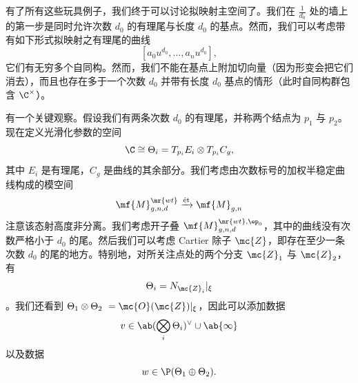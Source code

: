 有了所有这些玩具例子，我们终于可以讨论拟映射主空间了。我们在 \(\frac{1}{d_0}\) 处的墙上的第一步是同时允许次数 \(d_0\) 的有理尾与长度 \(d_0\) 的基点。然而，我们可以考虑带有如下形式拟映射之有理尾的曲线
\[ [a_0 u^{d_0}, \ldots, a_n u^{d_0}], \]
它们有无穷多个自同构。然而，我们不能在基点上附加切向量（因为形变会把它们消去），而且也存在多于一个次数 \(d_0\) 并带有长度 \(d_0\) 基点的情形（此时自同构群包含 \(\C^{\times}\)）。

\begin{rmk}
    有一个关键观察。假设我们有两条次数 \(d_0\) 的有理尾，并称两个结点为 \(p_1\) 与 \(p_2\)。现在定义光滑化参数的空间
    \[ \C \cong \Theta_i = T_{p_i} E_i \otimes T_{p_i} C_g, \]
    其中 \(E_i\) 是有理尾，\(C_g\) 是曲线的其余部分。我们考虑由次数标号的加权半稳定曲线构成的模空间
    \[ \mf{M}_{g,n,d}^{\mr{wt}} \xrightarrow{\text{\'et}} \mf{M}_{g,n} \]
    注意该态射高度非分离。我们考虑开子叠 \(\mf{M}_{g,n,d}^{\mr{wt}, \ep_0}\)，其中的曲线没有次数严格小于 \(d_0\) 的尾。然后我们可以考虑 Cartier 除子 \(\mc{Z}\)，即存在至少一条次数 \(d_0\) 的尾的地方。特别地，对所关注点处的两个分支 \(\mc{Z}_1\) 与 \(\mc{Z}_2\)，有
    \[ \Theta_i = N_{\mc{Z}_i} |_{\xi} \]
    。我们还看到 \(\Theta_1 \otimes \Theta_2\ = \mc{O}(\mc{Z})|_{\xi}\)，因此可以添加数据
    \[ v \in \ab(\bigotimes_i \Theta_i)^{\vee} \cup \ab\{\infty\} \]
    以及数据
    \[ w \in \P(\Theta_1 \oplus\Theta_2). \]
\end{rmk}


